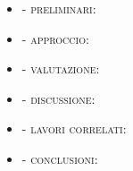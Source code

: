 \begin{itemize}

\item {} - \textsc{preliminari}: 


\item {} - \textsc{approccio}: 


\item {} - \textsc{valutazione}: 


\item {} - \textsc{discussione}:


\item {} - \textsc{lavori correlati}:


\item {} - \textsc{conclusioni}:


\end{itemize}

%
%

